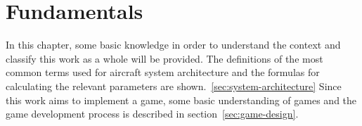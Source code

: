
\chapter{Fundamentals}\label{ch:fundamentals}
In this chapter, some basic knowledge in order to understand the context and classify this work as a whole will be provided.
The definitions of the most common terms used for aircraft system architecture and the formulas for calculating the relevant
parameters are shown.~\ref{sec:system-architecture}
Since this work aims to implement a game, some basic understanding of games and the game development process is described in
section~\ref{sec:game-design}.

